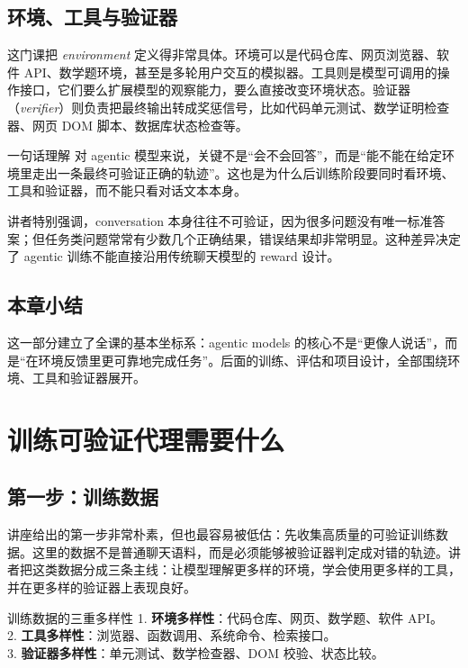 \documentclass[a4paper]{article}
\begin{document}
\subsection{环境、工具与验证器}
这门课把 \emph{environment} 定义得非常具体。环境可以是代码仓库、网页浏览器、软件 API、数学题环境，甚至是多轮用户交互的模拟器。工具则是模型可调用的操作接口，它们要么扩展模型的观察能力，要么直接改变环境状态。验证器（\emph{verifier}）则负责把最终输出转成奖惩信号，比如代码单元测试、数学证明检查器、网页 DOM 脚本、数据库状态检查等。

\begin{importantbox}{一句话理解}
对 agentic 模型来说，关键不是“会不会回答”，而是“能不能在给定环境里走出一条最终可验证正确的轨迹”。这也是为什么后训练阶段要同时看环境、工具和验证器，而不能只看对话文本本身。
\end{importantbox}

讲者特别强调，conversation 本身往往不可验证，因为很多问题没有唯一标准答案；但任务类问题常常有少数几个正确结果，错误结果却非常明显。这种差异决定了 agentic 训练不能直接沿用传统聊天模型的 reward 设计。

\subsection{本章小结}
这一部分建立了全课的基本坐标系：agentic models 的核心不是“更像人说话”，而是“在环境反馈里更可靠地完成任务”。后面的训练、评估和项目设计，全部围绕环境、工具和验证器展开。

\section{训练可验证代理需要什么}
\subsection{第一步：训练数据}
讲座给出的第一步非常朴素，但也最容易被低估：先收集高质量的可验证训练数据。这里的数据不是普通聊天语料，而是必须能够被验证器判定成对错的轨迹。讲者把这类数据分成三条主线：让模型理解更多样的环境，学会使用更多样的工具，并在更多样的验证器上表现良好。

\begin{knowledgebox}{训练数据的三重多样性}
1. \textbf{环境多样性}：代码仓库、网页、数学题、软件 API。\\
2. \textbf{工具多样性}：浏览器、函数调用、系统命令、检索接口。\\
3. \textbf{验证器多样性}：单元测试、数学检查器、DOM 校验、状态比较。
\end{knowledgebox}
\end{document}

